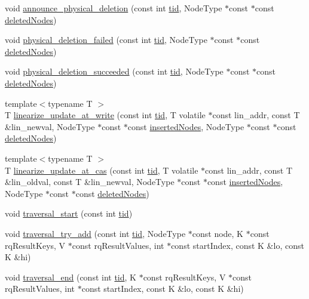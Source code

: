 \begin{DoxyCompactItemize}
\item 
void \hyperlink{classRQProvider_a29337e6766144d1c1a9aa752fe73fabf}{announce\+\_\+physical\+\_\+deletion} (const int \hyperlink{microbench_2main_8cpp_a9ca9869868fe7e7a38a921cc7de4103f}{tid}, Node\+Type $\ast$const $\ast$const \hyperlink{scxrecord_8h_ae536bce1bb8c0fffd7a3053f7d258f1e}{deleted\+Nodes})
\item 
void \hyperlink{classRQProvider_a1fb29a074556e0431ed22f2bee394c22}{physical\+\_\+deletion\+\_\+failed} (const int \hyperlink{microbench_2main_8cpp_a9ca9869868fe7e7a38a921cc7de4103f}{tid}, Node\+Type $\ast$const $\ast$const \hyperlink{scxrecord_8h_ae536bce1bb8c0fffd7a3053f7d258f1e}{deleted\+Nodes})
\item 
void \hyperlink{classRQProvider_a1bcce8dc80c1661b549a5ec6f9ee6d15}{physical\+\_\+deletion\+\_\+succeeded} (const int \hyperlink{microbench_2main_8cpp_a9ca9869868fe7e7a38a921cc7de4103f}{tid}, Node\+Type $\ast$const $\ast$const \hyperlink{scxrecord_8h_ae536bce1bb8c0fffd7a3053f7d258f1e}{deleted\+Nodes})
\item 
{\footnotesize template$<$typename T $>$ }\\T \hyperlink{classRQProvider_a632161f99e9c5792c70340e621ed22fd}{linearize\+\_\+update\+\_\+at\+\_\+write} (const int \hyperlink{microbench_2main_8cpp_a9ca9869868fe7e7a38a921cc7de4103f}{tid}, T volatile $\ast$const lin\+\_\+addr, const T \&lin\+\_\+newval, Node\+Type $\ast$const $\ast$const \hyperlink{scxrecord_8h_a0f26579d4b35e2dad20ee190a7986d08}{inserted\+Nodes}, Node\+Type $\ast$const $\ast$const \hyperlink{scxrecord_8h_ae536bce1bb8c0fffd7a3053f7d258f1e}{deleted\+Nodes})
\item 
{\footnotesize template$<$typename T $>$ }\\T \hyperlink{classRQProvider_a234b9ee35646cdff3d751df16424a57e}{linearize\+\_\+update\+\_\+at\+\_\+cas} (const int \hyperlink{microbench_2main_8cpp_a9ca9869868fe7e7a38a921cc7de4103f}{tid}, T volatile $\ast$const lin\+\_\+addr, const T \&lin\+\_\+oldval, const T \&lin\+\_\+newval, Node\+Type $\ast$const $\ast$const \hyperlink{scxrecord_8h_a0f26579d4b35e2dad20ee190a7986d08}{inserted\+Nodes}, Node\+Type $\ast$const $\ast$const \hyperlink{scxrecord_8h_ae536bce1bb8c0fffd7a3053f7d258f1e}{deleted\+Nodes})
\item 
void \hyperlink{classRQProvider_a96fe481c7ba6b30efbd90ac1eca1e788}{traversal\+\_\+start} (const int \hyperlink{microbench_2main_8cpp_a9ca9869868fe7e7a38a921cc7de4103f}{tid})
\item 
void \hyperlink{classRQProvider_ae67024f11a58a4a3e4a6cb86b7ed8292}{traversal\+\_\+try\+\_\+add} (const int \hyperlink{microbench_2main_8cpp_a9ca9869868fe7e7a38a921cc7de4103f}{tid}, Node\+Type $\ast$const node, K $\ast$const rq\+Result\+Keys, V $\ast$const rq\+Result\+Values, int $\ast$const start\+Index, const K \&lo, const K \&hi)
\item 
void \hyperlink{classRQProvider_ad4bbd6a7d5ea8f497a49ba3bbd03f7fc}{traversal\+\_\+end} (const int \hyperlink{microbench_2main_8cpp_a9ca9869868fe7e7a38a921cc7de4103f}{tid}, K $\ast$const rq\+Result\+Keys, V $\ast$const rq\+Result\+Values, int $\ast$const start\+Index, const K \&lo, const K \&hi)
\end{DoxyCompactItemize}


